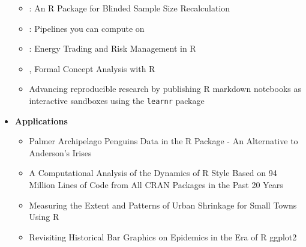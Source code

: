 \begin{itemize}
  \begin{itemize}
  \tightlist
  \item
    : An R Package for Blinded Sample Size
    Recalculation
  \item
    : Pipelines you can compute on
  \item
    : Energy Trading and Risk Management in R
  \item
    , Formal Concept Analysis with R
  \item
    Advancing reproducible research by publishing R markdown notebooks
    as interactive sandboxes using the \texttt{learnr} package
  \end{itemize}
\item
  \textbf{Applications}

  \begin{itemize}
  \tightlist
  \item
    Palmer Archipelago Penguins Data in the  R
    Package - An Alternative to Anderson's Irises
  \item
    A Computational Analysis of the Dynamics of R Style Based on 94
    Million Lines of Code from All CRAN Packages in the Past 20 Years
  \item
    Measuring the Extent and Patterns of Urban Shrinkage for Small Towns
    Using R
  \item
    Revisiting Historical Bar Graphics on Epidemics in the Era of R
    ggplot2
  \end{itemize}
\end{itemize}


\address{%
Catherine Hurley\\
Maynooth University\\%
\\
%
\url{https://journal.r-project.org}\\%
%
\href{mailto:r-journal@r-project.org}{\nolinkurl{r-journal@r-project.org}}%
}
